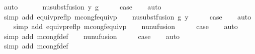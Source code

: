 \begin{isabellebody}
\ auto\isanewline
\ \ \isamarkupfalse%
\isanewline
{}\isamarkupfalse%
\isanewline
\ \ \isamarkupfalse%
\ {\isacharparenleft}{\kern0pt}nu{\isacharunderscore}{\kern0pt}subst{\isacharunderscore}{\kern0pt}fusion{}\ y\ g{\isacharparenright}{\kern0pt}\isanewline
\ \ \isamarkupfalse%
\ \isamarkupfalse%
\ {\isacharquery}{\kern0pt}case\isanewline
\ \ \isamarkupfalse%
\ auto\isanewline
\ \ \isamarkupfalse%
\ {\isacharparenleft}{\kern0pt}simp\ add{\isacharcolon}{\kern0pt}\ equivp{\isacharunderscore}{\kern0pt}reflp\ mcong{\isacharunderscore}{\kern0pt}f{\isacharunderscore}{\kern0pt}equivp{\isacharparenright}{\kern0pt}\isanewline
{}\isamarkupfalse%
\isanewline
\ \ \isamarkupfalse%
\ {\isacharparenleft}{\kern0pt}nu{\isacharunderscore}{\kern0pt}subst{\isacharunderscore}{\kern0pt}fusion{}\ g\ y{\isacharparenright}{\kern0pt}\isanewline
\ \ \isamarkupfalse%
\ \isamarkupfalse%
\ {\isacharquery}{\kern0pt}case\isanewline
\ \ \isamarkupfalse%
\ auto\isanewline
\ \ \isamarkupfalse%
\ {\isacharparenleft}{\kern0pt}simp\ add{\isacharcolon}{\kern0pt}\ equivp{\isacharunderscore}{\kern0pt}reflp\ mcong{\isacharunderscore}{\kern0pt}f{\isacharunderscore}{\kern0pt}equivp{\isacharparenright}{\kern0pt}\isanewline
{}\isamarkupfalse%
\isanewline
\ \ \isamarkupfalse%
\ nu{\isacharunderscore}{\kern0pt}nu{\isacharunderscore}{\kern0pt}fusion{}\isanewline
\ \ \isamarkupfalse%
\ \isamarkupfalse%
\ {\isacharquery}{\kern0pt}case\isanewline
\ \ \isamarkupfalse%
\ auto\isanewline
\ \ \isamarkupfalse%
\ {\isacharparenleft}{\kern0pt}simp\ add{\isacharcolon}{\kern0pt}\ mcong{\isacharunderscore}{\kern0pt}f{\isacharunderscore}{\kern0pt}def{\isacharparenright}{\kern0pt}\isanewline
{}\isamarkupfalse%
\isanewline
\ \ \isamarkupfalse%
\ nu{\isacharunderscore}{\kern0pt}nu{\isacharunderscore}{\kern0pt}fusion{}\isanewline
\ \ \isamarkupfalse%
\ \isamarkupfalse%
\ {\isacharquery}{\kern0pt}case\isanewline
\ \ \isamarkupfalse%
\ auto\isanewline
\ \ \isamarkupfalse%
\ {\isacharparenleft}{\kern0pt}simp\ add{\isacharcolon}{\kern0pt}\ mcong{\isacharunderscore}{\kern0pt}f{\isacharunderscore}{\kern0pt}def{\isacharparenright}{\kern0pt}\isanewline

\end{isabellebody}

